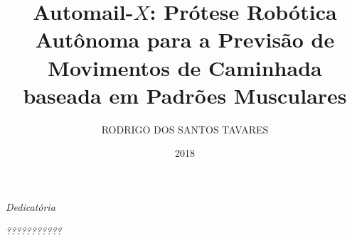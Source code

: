 \documentclass[
    12pt,       %
    oneside,    %
    a4paper,    %
%
    chapter=TITLE,	  	  %
%
    english,			  %
    brazil				  %
%
]{abntex2}
\title{Automail-$X$: Prótese Robótica Autônoma para a Previsão de Movimentos de Caminhada baseada em Padrões Musculares}
\author{RODRIGO DOS SANTOS TAVARES}
\date{2018}
\begin{document}


\imprimircapa{}

\imprimirfolhaderosto{}

\imprimirfolhadeaprovacao{}

\begin{dedicatoria}
   \vspace*{\fill}
   \centering
   \noindent
   \textit{Dedicatória} \vspace*{\fill}%
\end{dedicatoria}

\begin{agradecimentos}[Agradecimentos]
  \textcolor{red}{\lipsum[1]}%
\end{agradecimentos}

\begin{epigrafe}
    \vspace*{\fill}
	\begin{flushright}
		\textit{???????????} %
	\end{flushright}
\end{epigrafe}
\end{document}
